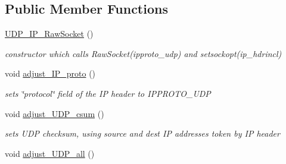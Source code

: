 \subsection*{Public Member Functions}
\begin{CompactItemize}
\item 
\hypertarget{classsocketpp_1_1UDP__IP__RawSocket_90e90d941b64d234c231ca543fe8745a}{
\hyperlink{classsocketpp_1_1UDP__IP__RawSocket_90e90d941b64d234c231ca543fe8745a}{UDP\_\-IP\_\-RawSocket} ()}
\label{classsocketpp_1_1UDP__IP__RawSocket_90e90d941b64d234c231ca543fe8745a}

\begin{CompactList}\small\item\em constructor which calls RawSocket(ipproto\_\-udp) and setsockopt(ip\_\-hdrincl) \item\end{CompactList}\item 
\hypertarget{classsocketpp_1_1UDP__IP__RawSocket_55164dda01fba51c6a2f261caa96780f}{
void \hyperlink{classsocketpp_1_1UDP__IP__RawSocket_55164dda01fba51c6a2f261caa96780f}{adjust\_\-IP\_\-proto} ()}
\label{classsocketpp_1_1UDP__IP__RawSocket_55164dda01fba51c6a2f261caa96780f}

\begin{CompactList}\small\item\em sets \char`\"{}protocol\char`\"{} field of the IP header to IPPROTO\_\-UDP \item\end{CompactList}\item 
\hypertarget{classsocketpp_1_1UDP__IP__RawSocket_6c2f6c375cec90f64fd093af37369d6a}{
void \hyperlink{classsocketpp_1_1UDP__IP__RawSocket_6c2f6c375cec90f64fd093af37369d6a}{adjust\_\-UDP\_\-csum} ()}
\label{classsocketpp_1_1UDP__IP__RawSocket_6c2f6c375cec90f64fd093af37369d6a}

\begin{CompactList}\small\item\em sets UDP checksum, using source and dest IP addresses token by IP header \item\end{CompactList}\item 
\hypertarget{classsocketpp_1_1UDP__IP__RawSocket_94bec31d8c856ccdafa083c74b8b7e58}{
void \hyperlink{classsocketpp_1_1UDP__IP__RawSocket_94bec31d8c856ccdafa083c74b8b7e58}{adjust\_\-UDP\_\-all} ()}
\label{classsocketpp_1_1UDP__IP__RawSocket_94bec31d8c856ccdafa083c74b8b7e58}


\end{CompactItemize}
